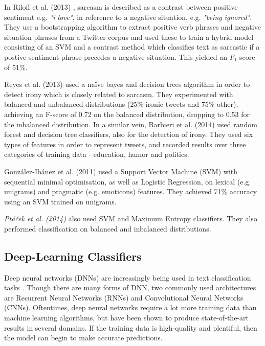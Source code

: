 \documentclass[12pt,a4paper]{article}
\begin{document}
In Riloff et al. (2013) \cite{riloff2013sarcasm}, sarcasm is described as a contrast between positive sentiment e.g. \textit{"i love"}, in reference to a negative situation, e.g. \textit{"being ignored"}. They use a bootstrapping algorithm to extract positive verb phrases and negative situation phrases from a Twitter corpus and used these to train a hybrid model consisting of an SVM and a contrast method which classifies text as sarcastic if a postive sentiment phrase precedes a negative situation. This yielded an $F_1$ score of 51\%.

Reyes et al. (2013) \cite{reyes2013multidimensional} used a na\"{i}ve bayes and decision trees algorithm in order to detect irony which is closely related to sarcasm. They experimented with balanced and unbalanced distributions (25\% ironic tweets and 75\% other), achieving an F-score of 0.72 on the balanced distribution, dropping to 0.53 for the inbalanced distribution. In a similar vein, Barbieri et al. (2014) \cite{barbieri2014modelling} used random forest and decision tree classifiers, also for the detection of irony. They used six types of features in order to represent tweets, and recorded results over three categories of training data - education, humor and politics.

Gonz{\'a}lez-Ib{\'a}nez et al. (2011) \cite{gonzalez2011identifying} used a Support Vector Machine (SVM) with sequential minimal optimisation, as well as Logistic Regression, on lexical (e.g. unigrams) and pragmatic (e.g. emoticons) features. They achieved 71\% accuracy using an SVM trained on unigrams.

 \textit{Pt{\'a}{\v{c}ek et al. (2014)}} \cite{ptavcek2014sarcasm} also used SVM and Maximum Entropy classifiers. They also performed classification on balanced and inbalanced distributions.

\subsection{Deep-Learning Classifiers}\vspace{-10pt}
Deep neural networks (DNNs) are increasingly being used in text classification tasks \cite{zhang2015character, poria2016deeper}. Though there are many forms of DNN, two commonly used architectures are Recurrent Neural Networks (RNNs) and Convolutional Neural Networks (CNNs). Oftentimes, deep neural networks require a lot more training data than machine learning algorithms, but have been shown to produce state-of-the-art results in several domains. If the training data is high-quality and plentiful, then the model can begin to make accurate predictions. 
\end{document}
